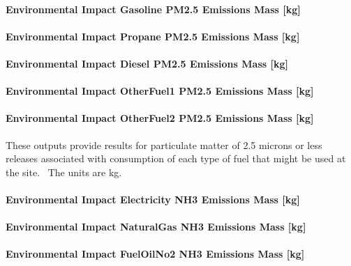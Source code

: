 \paragraph{Environmental Impact Gasoline PM2.5 Emissions Mass {[}kg{]}}\label{environmental-impact-gasoline-pm2.5-emissions-mass-kg}

\paragraph{Environmental Impact Propane PM2.5 Emissions Mass {[}kg{]}}\label{environmental-impact-propane-pm2.5-emissions-mass-kg}

\paragraph{Environmental Impact Diesel PM2.5 Emissions Mass {[}kg{]}}\label{environmental-impact-diesel-pm2.5-emissions-mass-kg}

\paragraph{Environmental Impact OtherFuel1 PM2.5 Emissions Mass {[}kg{]}}\label{environmental-impact-otherfuel1-pm2.5-emissions-mass-kg}

\paragraph{Environmental Impact OtherFuel2 PM2.5 Emissions Mass {[}kg{]}}\label{environmental-impact-otherfuel2-pm2.5-emissions-mass-kg}

These outputs provide results for particulate matter of 2.5 microns or less releases associated with consumption of each type of fuel that might be used at the site.~ The units are kg.

\paragraph{Environmental Impact Electricity NH3 Emissions Mass {[}kg{]}}\label{environmental-impact-electricity-nh3-emissions-mass-kg}

\paragraph{Environmental Impact NaturalGas NH3 Emissions Mass {[}kg{]}}\label{environmental-impact-natural-gas-nh3-emissions-mass-kg}

\paragraph{Environmental Impact FuelOilNo2 NH3 Emissions Mass {[}kg{]}}\label{environmental-impact-fuel-oil-2-nh3-emissions-mass-kg}

